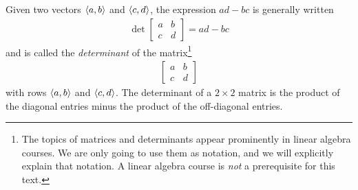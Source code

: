 Given two vectors $\left< a,b\right> $ and $\left< c,d\right> $, the expression 
$ad-bc$ is generally written
\begin{align*}
\det\left[\begin{matrix}a&b\\ c&d\end{matrix}\right]=ad-bc
\end{align*}
and is called the \emph{determinant} of the matrix\footnote{The topics of
matrices and determinants appear prominently in linear algebra courses. We
are only going to use them as notation, and we will explicitly explain
that notation. A linear algebra course is \emph{not} a prerequisite 
for this text.} 
\begin{align*}
\left[\begin{matrix}a&b\\ c&d\end{matrix}\right]
\end{align*} 
with rows $\left< a,b\right> $ and $\left< c,d\right> $. The determinant
of a $2\times 2$ matrix is the product of the diagonal entries 
minus the product of the off-diagonal entries. 


